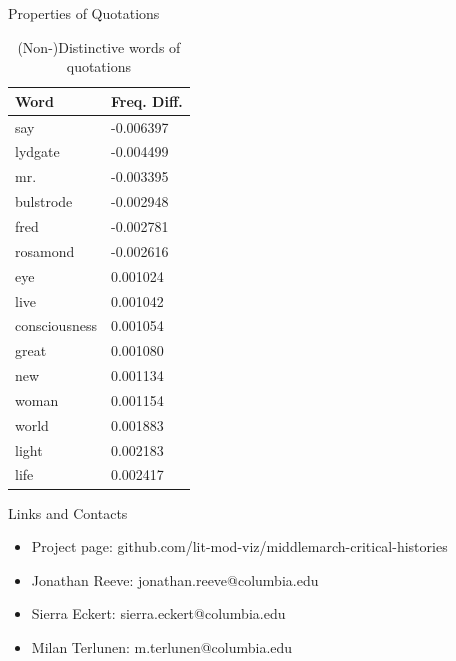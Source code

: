 \documentclass[final]{beamer}
\newlength{\onecolwid}
\begin{document}
\begin{frame}[t]
\begin{columns}[t]
\begin{column}{\onecolwid}
\begin{block}{Properties of Quotations}
\begin{table}
\vspace{2ex}
\begin{tabular}{l l}
\toprule
\textbf{Word} & \textbf{Freq. Diff.} \\
\midrule
say           &  -0.006397 \\
lydgate       &  -0.004499 \\
mr.           &  -0.003395 \\
bulstrode     &  -0.002948 \\
fred          &  -0.002781 \\
rosamond      &  -0.002616 \\
\midrule
eye          &   0.001024 \\
live         &   0.001042 \\
consciousness &   0.001054 \\
great        &   0.001080 \\
new          &   0.001134 \\
woman        &   0.001154 \\
world        &   0.001883 \\
light        &   0.002183 \\
life         &   0.002417 \\
\bottomrule
\end{tabular}
\caption{(Non-)Distinctive words of quotations}
\end{table}

\end{block}


\begin{block}{Links and Contacts}

\begin{itemize}
\item Project page: github.com/lit-mod-viz/middlemarch-critical-histories
\item Jonathan Reeve: jonathan.reeve@columbia.edu
\item Sierra Eckert: sierra.eckert@columbia.edu
\item Milan Terlunen: m.terlunen@columbia.edu 
\end{itemize}

\end{block}


\end{column} %

\end{columns} %

\end{frame} %
\end{document}

